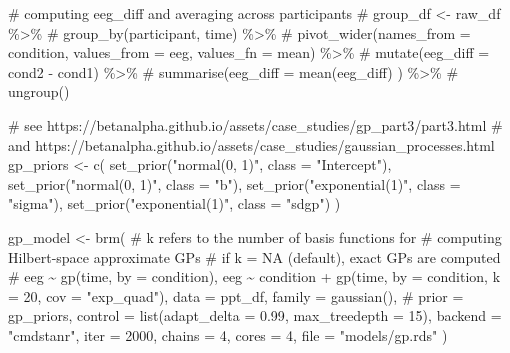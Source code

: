 \documentclass[
  doc,
  floatsintext,
  longtable,
  a4paper,
  nolmodern,
  notxfonts,
  notimes,
  colorlinks=true,linkcolor=blue,citecolor=blue,urlcolor=blue]{apa7}
\newenvironment{Shaded}{\begin{snugshade}}{\end{snugshade}}
\newcommand{\AttributeTok}[1]{\textcolor[rgb]{0.40,0.45,0.13}{#1}}
\newcommand{\CommentTok}[1]{\textcolor[rgb]{0.37,0.37,0.37}{#1}}
\newcommand{\DecValTok}[1]{\textcolor[rgb]{0.68,0.00,0.00}{#1}}
\newcommand{\FloatTok}[1]{\textcolor[rgb]{0.68,0.00,0.00}{#1}}
\newcommand{\FunctionTok}[1]{\textcolor[rgb]{0.28,0.35,0.67}{#1}}
\newcommand{\NormalTok}[1]{\textcolor[rgb]{0.00,0.23,0.31}{#1}}
\newcommand{\OtherTok}[1]{\textcolor[rgb]{0.00,0.23,0.31}{#1}}
\newcommand{\SpecialCharTok}[1]{\textcolor[rgb]{0.37,0.37,0.37}{#1}}
\newcommand{\StringTok}[1]{\textcolor[rgb]{0.13,0.47,0.30}{#1}}
\begin{document}
\begin{Shaded}
\begin{Highlighting}[]
\CommentTok{\# computing eeg\_diff and averaging across participants}
\CommentTok{\# group\_df \textless{}{-} raw\_df \%\textgreater{}\%}
\CommentTok{\#     group\_by(participant, time) \%\textgreater{}\%}
\CommentTok{\#     pivot\_wider(names\_from = condition, values\_from = eeg, values\_fn = mean) \%\textgreater{}\%}
\CommentTok{\#     mutate(eeg\_diff = cond2 {-} cond1) \%\textgreater{}\%}
\CommentTok{\#     summarise(eeg\_diff = mean(eeg\_diff) ) \%\textgreater{}\%}
\CommentTok{\#     ungroup()}

\CommentTok{\# see https://betanalpha.github.io/assets/case\_studies/gp\_part3/part3.html}
\CommentTok{\# and https://betanalpha.github.io/assets/case\_studies/gaussian\_processes.html}
\NormalTok{gp\_priors }\OtherTok{\textless{}{-}} \FunctionTok{c}\NormalTok{(}
    \FunctionTok{set\_prior}\NormalTok{(}\StringTok{"normal(0, 1)"}\NormalTok{, }\AttributeTok{class =} \StringTok{"Intercept"}\NormalTok{),}
    \FunctionTok{set\_prior}\NormalTok{(}\StringTok{"normal(0, 1)"}\NormalTok{, }\AttributeTok{class =} \StringTok{"b"}\NormalTok{),}
    \FunctionTok{set\_prior}\NormalTok{(}\StringTok{"exponential(1)"}\NormalTok{, }\AttributeTok{class =} \StringTok{"sigma"}\NormalTok{),}
    \FunctionTok{set\_prior}\NormalTok{(}\StringTok{"exponential(1)"}\NormalTok{, }\AttributeTok{class =} \StringTok{"sdgp"}\NormalTok{)}
\NormalTok{    )}

\NormalTok{gp\_model }\OtherTok{\textless{}{-}} \FunctionTok{brm}\NormalTok{(}
    \CommentTok{\# k refers to the number of basis functions for}
    \CommentTok{\# computing Hilbert{-}space approximate GPs}
    \CommentTok{\# if k = NA (default), exact GPs are computed}
    \CommentTok{\# eeg \textasciitilde{} gp(time, by = condition),}
\NormalTok{    eeg }\SpecialCharTok{\textasciitilde{}}\NormalTok{ condition }\SpecialCharTok{+} \FunctionTok{gp}\NormalTok{(time, }\AttributeTok{by =}\NormalTok{ condition, }\AttributeTok{k =} \DecValTok{20}\NormalTok{, }\AttributeTok{cov =} \StringTok{"exp\_quad"}\NormalTok{),}
    \AttributeTok{data =}\NormalTok{ ppt\_df,}
    \AttributeTok{family =} \FunctionTok{gaussian}\NormalTok{(),}
    \CommentTok{\# prior = gp\_priors,}
    \AttributeTok{control =} \FunctionTok{list}\NormalTok{(}\AttributeTok{adapt\_delta =} \FloatTok{0.99}\NormalTok{, }\AttributeTok{max\_treedepth =} \DecValTok{15}\NormalTok{),}
    \AttributeTok{backend =} \StringTok{"cmdstanr"}\NormalTok{,}
    \AttributeTok{iter =} \DecValTok{2000}\NormalTok{,}
    \AttributeTok{chains =} \DecValTok{4}\NormalTok{,}
    \AttributeTok{cores =} \DecValTok{4}\NormalTok{,}
    \AttributeTok{file =} \StringTok{"models/gp.rds"}
\NormalTok{    )}
\end{Highlighting}
\end{Shaded}
\end{document}
